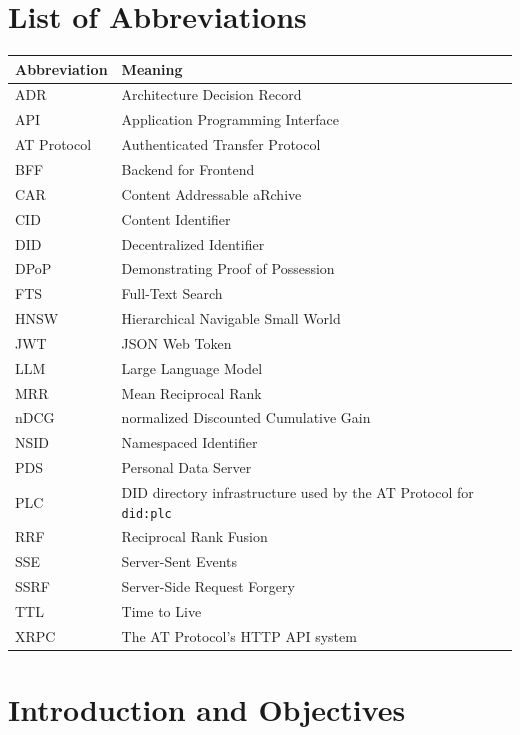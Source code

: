 \documentclass[11pt,a4paper]{article}
\newcommand{\code}[1]{\texttt{#1}}
\begin{document}
\clearpage
\tableofcontents

\clearpage
\listoffigures
\listoftables

\clearpage
\section*{List of Abbreviations}

{
\begin{tabularx}{\textwidth}{@{}lY@{}}
\toprule
\textbf{Abbreviation} & \textbf{Meaning} \\
\midrule
ADR & Architecture Decision Record \\
API & Application Programming Interface \\
AT Protocol & Authenticated Transfer Protocol \\
BFF & Backend for Frontend \\
CAR & Content Addressable aRchive \\
CID & Content Identifier \\
DID & Decentralized Identifier \\
DPoP & Demonstrating Proof of Possession \\
FTS & Full-Text Search \\
HNSW & Hierarchical Navigable Small World \\
JWT & JSON Web Token \\
LLM & Large Language Model \\
MRR & Mean Reciprocal Rank \\
nDCG & normalized Discounted Cumulative Gain \\
NSID & Namespaced Identifier \\
PDS & Personal Data Server \\
PLC & DID directory infrastructure used by the AT Protocol for \code{did:plc} \\
RRF & Reciprocal Rank Fusion \\
SSE & Server-Sent Events \\
SSRF & Server-Side Request Forgery \\
TTL & Time to Live \\
XRPC & The AT Protocol's HTTP API system \\
\bottomrule
\end{tabularx}
\par}

\clearpage
{}

\section{Introduction and Objectives}
\end{document}
